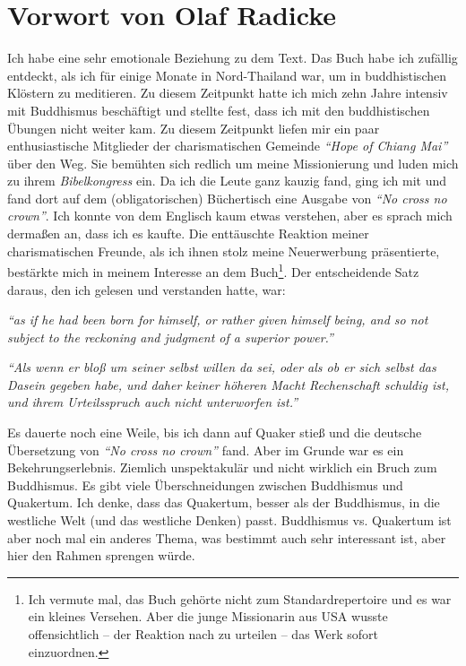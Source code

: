 \part{Vorwort von Olaf Radicke}


Ich habe eine sehr emotionale Beziehung zu dem Text. Das Buch habe ich zufällig
entdeckt, als ich für einige Monate in Nord-Thailand war, um in
buddhistischen
Klöstern zu meditieren. Zu diesem Zeitpunkt hatte ich mich zehn Jahre intensiv
mit
Buddhismus beschäftigt und stellte fest, dass ich mit den buddhistischen Übungen
nicht weiter kam. Zu diesem Zeitpunkt liefen mir ein paar enthusiastische
Mitglieder der charismatischen Gemeinde \textit{"`Hope of Chiang Mai"'} über
den Weg. Sie bemühten sich redlich um meine Missionierung und luden mich zu
ihrem \textit{Bibelkongress} ein. Da ich die Leute ganz kauzig fand, ging ich
mit und fand dort auf dem (obligatorischen) Büchertisch eine Ausgabe
von \textit{"`No cross no crown"'}.
Ich konnte von dem Englisch kaum etwas verstehen, aber es sprach mich dermaßen
an, dass ich es kaufte. Die enttäuschte Reaktion meiner charismatischen Freunde,
als ich ihnen stolz meine Neuerwerbung präsentierte, bestärkte mich in meinem
Interesse an dem Buch\footnote{Ich vermute mal, das Buch gehörte nicht zum
Standardrepertoire und es war ein kleines Versehen. Aber die junge Missionarin
aus USA wusste offensichtlich -- der Reaktion nach zu urteilen -- das Werk
sofort einzuordnen.}. Der entscheidende Satz daraus, den ich gelesen und
verstanden hatte, war:

\begin{center}
\parbox{7,5cm}{
\textit{"`as if he had been born for himself, or rather given himself being,
and so not subject to the reckoning and judgment of a superior power."'}

\medskip

\textit{"`Als wenn er bloß um seiner selbst willen da sei, oder als ob er
sich selbst das Dasein gegeben habe, und daher keiner höheren Macht Rechenschaft
schuldig ist, und ihrem Urteilsspruch auch nicht unterworfen ist."'}
}
\end{center}

\medskip

Es dauerte noch eine Weile, bis ich dann auf Quaker stieß und die deutsche
Übersetzung von \textit{"`No cross no crown"'} fand. Aber im Grunde war es ein
Bekehrungserlebnis. Ziemlich unspektakulär und nicht wirklich ein Bruch zum
Buddhismus. Es gibt viele Überschneidungen zwischen Buddhismus und Quakertum.
Ich denke, dass das Quakertum, besser als der Buddhismus, in die westliche Welt
(und das westliche
Denken) passt. Buddhismus vs. Quakertum ist aber noch mal
ein anderes Thema, was bestimmt auch sehr interessant ist, aber hier den Rahmen
sprengen würde.

